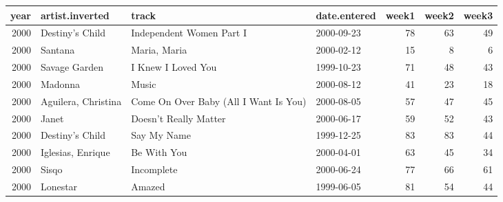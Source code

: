 \begin{tabular}{rlllrrr}
  \toprule
 year & artist.inverted & track & date.entered & week1 & week2 & week3 \\ 
  \midrule
  2000 & Destiny's Child & Independent Women Part I & 2000-09-23 &  78 &  63 &  49 \\ 
  2000 & Santana & Maria, Maria & 2000-02-12 &  15 &   8 &   6 \\ 
  2000 & Savage Garden & I Knew I Loved You & 1999-10-23 &  71 &  48 &  43 \\ 
  2000 & Madonna & Music & 2000-08-12 &  41 &  23 &  18 \\ 
  2000 & Aguilera, Christina & Come On Over Baby (All I Want Is You) & 2000-08-05 &  57 &  47 &  45 \\ 
  2000 & Janet & Doesn't Really Matter & 2000-06-17 &  59 &  52 &  43 \\ 
  2000 & Destiny's Child & Say My Name & 1999-12-25 &  83 &  83 &  44 \\ 
  2000 & Iglesias, Enrique & Be With You & 2000-04-01 &  63 &  45 &  34 \\ 
  2000 & Sisqo & Incomplete & 2000-06-24 &  77 &  66 &  61 \\ 
  2000 & Lonestar & Amazed & 1999-06-05 &  81 &  54 &  44 \\ 
   \bottomrule
\end{tabular}

